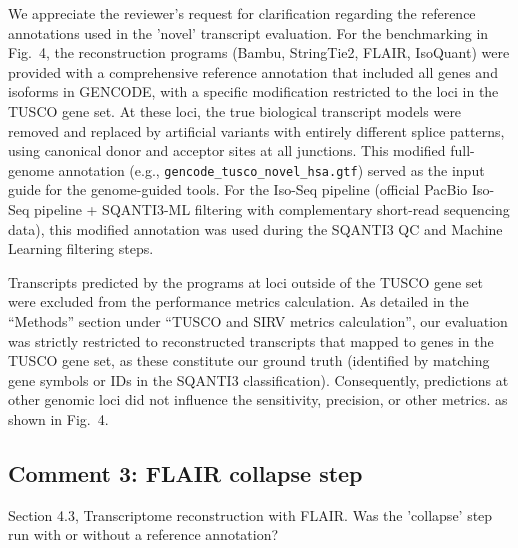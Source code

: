 \documentclass[11pt]{article}
\begin{document}
\begin{responseboxnew}
We appreciate the reviewer's request for clarification regarding the reference annotations used in the 'novel' transcript evaluation. For the benchmarking in Fig.~4, the reconstruction programs (Bambu, StringTie2, FLAIR, IsoQuant) were provided with a comprehensive reference annotation that included all genes and isoforms in GENCODE, with a specific modification restricted to the loci in the TUSCO gene set. At these loci, the true biological transcript models were removed and replaced by artificial variants with entirely different splice patterns, using canonical donor and acceptor sites at all junctions. This modified full-genome annotation (e.g., \texttt{gencode\_tusco\_novel\_hsa.gtf}) served as the input guide for the genome-guided tools. For the Iso-Seq pipeline (official PacBio Iso-Seq pipeline + SQANTI3-ML filtering with complementary short-read sequencing data), this modified annotation was used during the SQANTI3 QC and Machine Learning filtering steps.

Transcripts predicted by the programs at loci outside of the TUSCO gene set were excluded from the performance metrics calculation. As detailed in the ``Methods'' section under ``TUSCO and SIRV metrics calculation'', our evaluation was strictly restricted to reconstructed transcripts that mapped to genes in the TUSCO gene set, as these constitute our ground truth (identified by matching gene symbols or IDs in the SQANTI3 classification). Consequently, predictions at other genomic loci did not influence the sensitivity, precision, or other metrics. as shown in Fig.~4.
\end{responseboxnew}

\subsection{Comment 3: FLAIR collapse step}

\begin{reviewercomment}
Section 4.3, Transcriptome reconstruction with FLAIR. Was the 'collapse' step run with or without a reference annotation?
\end{reviewercomment}
\end{document}
